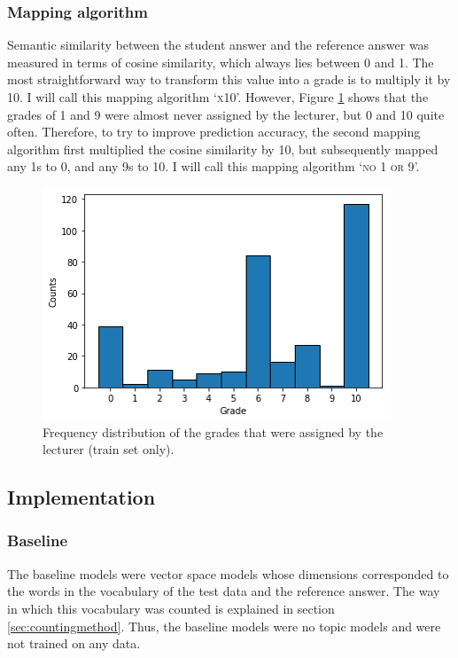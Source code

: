\documentclass[a4paper,10pt,twoside]{article}
\begin{document}

\subsubsection{Mapping algorithm}
Semantic similarity between the student answer and the reference answer was measured in terms of cosine similarity, which always lies between 0 and 1. The most straightforward way to transform this value into a grade is to multiply it by 10. I will call this mapping algorithm `\textsc{x10}'. However, Figure \ref{fig:histogram} shows that the grades of 1 and 9 were almost never assigned by the lecturer, but 0 and 10 quite often. Therefore, to try to improve prediction accuracy, the second mapping algorithm first multiplied the cosine similarity by 10, but subsequently mapped any 1s to 0, and any 9s to 10. I will call this mapping algorithm `\textsc{no 1 or 9}'.

\begin{figure}[h]
	\centering
	\includegraphics[width=0.5\linewidth]{"Histogram of grades"}
	\caption{Frequency distribution of the grades that were assigned by the lecturer (train set only).}
	\label{fig:histogram}
\end{figure} 

\subsection{Implementation}

\subsubsection{Baseline}
The baseline models were vector space models whose dimensions corresponded to the words in the vocabulary of the test data and the reference answer. The way in which this vocabulary was counted is explained in section \ref{sec:countingmethod}. Thus, the baseline models were no topic models and were not trained on any data.
\end{document}
